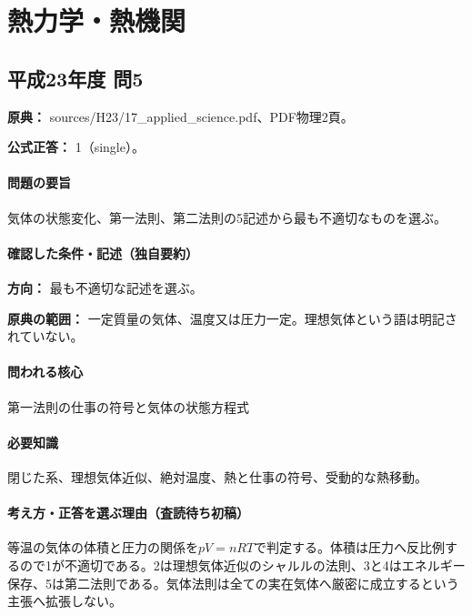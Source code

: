 \section{熱力学・熱機関}

\subsection{平成23年度 問5}
\label{q:h23-reg-applied-05}

\noindent\textbf{原典：} sources/H23/17\_applied\_science.pdf、PDF物理2頁。

\textbf{公式正答：} 1（single）。

\paragraph{問題の要旨} 気体の状態変化、第一法則、第二法則の5記述から最も不適切なものを選ぶ。

\paragraph{確認した条件・記述（独自要約）}\mbox{}\par

\noindent\textbf{方向：} 最も不適切な記述を選ぶ。\par

\noindent\textbf{原典の範囲：} 一定質量の気体、温度又は圧力一定。理想気体という語は明記されていない。\par

\paragraph{問われる核心} 第一法則の仕事の符号と気体の状態方程式

\paragraph{必要知識} 閉じた系、理想気体近似、絶対温度、熱と仕事の符号、受動的な熱移動。

\paragraph{考え方・正答を選ぶ理由（査読待ち初稿）} 等温の気体の体積と圧力の関係を\(pV=nRT\)で判定する。体積は圧力へ反比例するので1が不適切である。2は理想気体近似のシャルルの法則、3と4はエネルギー保存、5は第二法則である。気体法則は全ての実在気体へ厳密に成立するという主張へ拡張しない。

